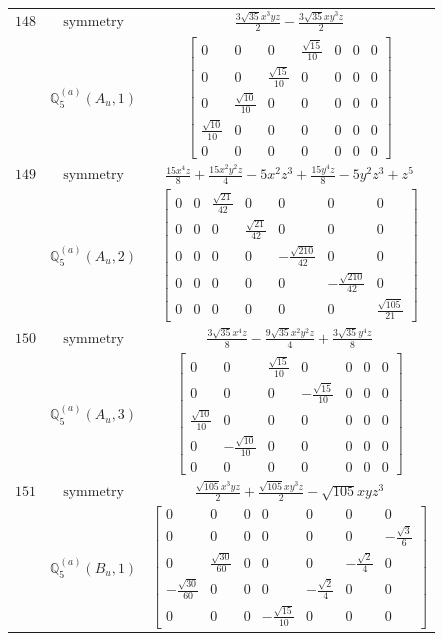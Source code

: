 \documentclass[fleqn,8pt,landscape]{jsarticle}
\begin{document}
\begin{longtable}{ccc}
$ 148 $ & $ \text{symmetry} $ & $ \frac{3 \sqrt{35} x^{3} y z}{2} - \frac{3 \sqrt{35} x y^{3} z}{2} $ \\
$  $ & $ \mathbb{Q}_{5}^{(a)}(A_{u},1) $ & $ \begin{bmatrix} 0 & 0 & 0 & \frac{\sqrt{15}}{10} & 0 & 0 & 0 \\ 0 & 0 & \frac{\sqrt{15}}{10} & 0 & 0 & 0 & 0 \\ 0 & \frac{\sqrt{10}}{10} & 0 & 0 & 0 & 0 & 0 \\ \frac{\sqrt{10}}{10} & 0 & 0 & 0 & 0 & 0 & 0 \\ 0 & 0 & 0 & 0 & 0 & 0 & 0 \end{bmatrix} $ \\ \hline
$ 149 $ & $ \text{symmetry} $ & $ \frac{15 x^{4} z}{8} + \frac{15 x^{2} y^{2} z}{4} - 5 x^{2} z^{3} + \frac{15 y^{4} z}{8} - 5 y^{2} z^{3} + z^{5} $ \\
$  $ & $ \mathbb{Q}_{5}^{(a)}(A_{u},2) $ & $ \begin{bmatrix} 0 & 0 & \frac{\sqrt{21}}{42} & 0 & 0 & 0 & 0 \\ 0 & 0 & 0 & \frac{\sqrt{21}}{42} & 0 & 0 & 0 \\ 0 & 0 & 0 & 0 & - \frac{\sqrt{210}}{42} & 0 & 0 \\ 0 & 0 & 0 & 0 & 0 & - \frac{\sqrt{210}}{42} & 0 \\ 0 & 0 & 0 & 0 & 0 & 0 & \frac{\sqrt{105}}{21} \end{bmatrix} $ \\ \hline
$ 150 $ & $ \text{symmetry} $ & $ \frac{3 \sqrt{35} x^{4} z}{8} - \frac{9 \sqrt{35} x^{2} y^{2} z}{4} + \frac{3 \sqrt{35} y^{4} z}{8} $ \\
$  $ & $ \mathbb{Q}_{5}^{(a)}(A_{u},3) $ & $ \begin{bmatrix} 0 & 0 & \frac{\sqrt{15}}{10} & 0 & 0 & 0 & 0 \\ 0 & 0 & 0 & - \frac{\sqrt{15}}{10} & 0 & 0 & 0 \\ \frac{\sqrt{10}}{10} & 0 & 0 & 0 & 0 & 0 & 0 \\ 0 & - \frac{\sqrt{10}}{10} & 0 & 0 & 0 & 0 & 0 \\ 0 & 0 & 0 & 0 & 0 & 0 & 0 \end{bmatrix} $ \\ \hline
$ 151 $ & $ \text{symmetry} $ & $ \frac{\sqrt{105} x^{3} y z}{2} + \frac{\sqrt{105} x y^{3} z}{2} - \sqrt{105} x y z^{3} $ \\
$  $ & $ \mathbb{Q}_{5}^{(a)}(B_{u},1) $ & $ \begin{bmatrix} 0 & 0 & 0 & 0 & 0 & 0 & 0 \\ 0 & 0 & 0 & 0 & 0 & 0 & - \frac{\sqrt{3}}{6} \\ 0 & \frac{\sqrt{30}}{60} & 0 & 0 & 0 & - \frac{\sqrt{2}}{4} & 0 \\ - \frac{\sqrt{30}}{60} & 0 & 0 & 0 & - \frac{\sqrt{2}}{4} & 0 & 0 \\ 0 & 0 & 0 & - \frac{\sqrt{15}}{10} & 0 & 0 & 0 \end{bmatrix} $ \\ \hline

\end{longtable}
\end{document}
